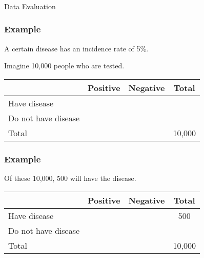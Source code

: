 \begin{frame}[fragile]\frametitle{}
\begin{center}
{\Large Data Evaluation}
\end{center}
\end{frame}



\begin{frame}
\frametitle{Example}
A certain disease has an incidence rate of 5\%.  %

\vspace{.1in}
Imagine 10,000 people who are tested.\\ 
\begin{center}
\begin{tabular}{|l|c|c|c|}
\hline
& Positive & Negative &Total\\
\hline
Have disease & &&\\
\hline
Do not have disease && &\\
\hline
Total &&&10,000\\
\hline
\end{tabular}
\end{center}
\end{frame}

\begin{frame}
\frametitle{Example}

\vspace{.1in}
Of these 10,000, 500 will have the disease.\\ 
\begin{center}
\begin{tabular}{|l|c|c|c|}
\hline
& Positive & Negative &Total\\
\hline
Have disease & &&500\\
\hline
Do not have disease && &\\
\hline
Total &&&10,000\\
\hline
\end{tabular}
\end{center}
\end{frame}

